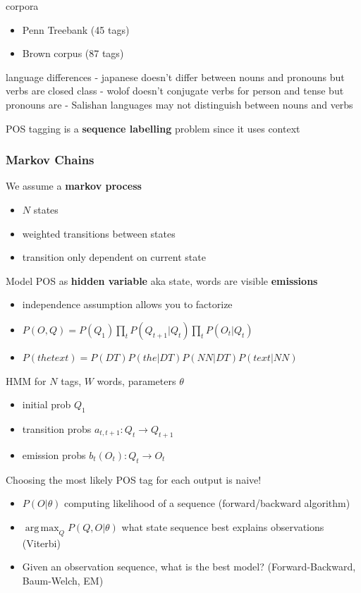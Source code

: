 \documentclass[]{article}
\DeclareMathOperator*{\argmax}{arg\,max}
\theoremstyle{definition}
\begin{document}
corpora
\begin{itemize}
    \item Penn Treebank (45 tags)
    \item Brown corpus (87 tags)
\end{itemize}

language differences
- japanese doesn't differ between nouns and pronouns but verbs are closed class
- wolof doesn't conjugate verbs for person and tense but pronouns are
- Salishan languages may not distinguish between nouns and verbs

POS tagging is a \textbf{sequence labelling} problem since it uses context

\subsubsection{Markov Chains}%
\label{ssub:markov_chains}

We assume a \textbf{markov process}
\begin{itemize}
    \item $N$ states
    \item weighted transitions between states
    \item transition only dependent on current state
\end{itemize}

Model POS as \textbf{hidden variable} aka state, words are visible \textbf{emissions}
\begin{itemize}
    \item independence assumption allows you to factorize
    \item $P(O,Q) = P(Q_1) \prod_t P(Q_{t+1}|Q_t) \prod_t P(O_t | Q_t)$
    \item $P(the text) = P(DT) P(the | DT) P(NN | DT) P (text | NN)$
\end{itemize}

HMM for $N$ tags, $W$ words, parameters $\theta$
\begin{itemize}
    \item initial prob $Q_1$
    \item transition probs $a_{t,t+1}: Q_t \to Q_{t+1}$
    \item emission probs $b_t(O_t): Q_t \to O_t$
\end{itemize}


Choosing the most likely POS tag for each output is naive!
\begin{itemize}
    \item $P(O|\theta)$ computing likelihood of a sequence (forward/backward algorithm)
    \item $\argmax_Q P(Q, O|\theta)$ what state sequence best explains observations (Viterbi)
    \item Given an observation sequence, what is the best model? (Forward-Backward, Baum-Welch, EM)
\end{itemize}
\end{document}
